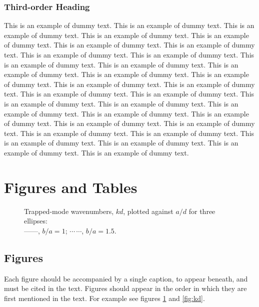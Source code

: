 \documentclass[lineno]{jfm}
\begin{document}
 \subsubsection {Third-order Heading}
 This is an example of dummy text. This is an example of dummy text. This is an example of dummy text. This is an example of dummy text. This is an example of dummy text. This is an example of dummy text. This is an example of dummy text. This is an example of dummy text. This is an example of dummy text. This is an example of dummy text. This is an example of dummy text. This is an example of dummy text. This is an example of dummy text. This is an example of dummy text. This is an example of dummy text. This is an example of dummy text. This is an example of dummy text. This is an example of dummy text. This is an example of dummy text. This is an example of dummy text. This is an example of dummy text. This is an example of dummy text. This is an example of dummy text. This is an example of dummy text. This is an example of dummy text. This is an example of dummy text. This is an example of dummy text. This is an example of dummy text. This is an example of dummy text. This is an example of dummy text. This is an example of dummy text.
\section{Figures and Tables}\label{sec:Figures_Tables}

\begin{figure}
  \caption{Trapped-mode wavenumbers, $kd$, plotted against $a/d$ for
    three ellipses:\protect\\
    ---$\!$---,
    $b/a=1$; $\cdots$\,$\cdots$, $b/a=1.5$.}
\label{fig:ka}
\end{figure}

\subsection{Figures}
 Each figure should be accompanied by a single caption, to appear beneath, and must be cited in the text. Figures should appear in the order in which they are first mentioned in the text. For example see figures \ref{fig:ka} and \ref{fig:kd}.
\end{document}
